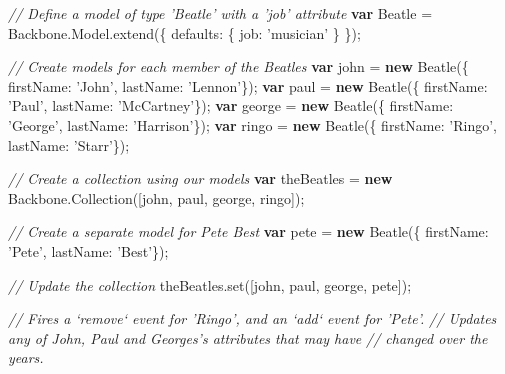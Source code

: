 \documentclass[9pt]{book}
\newenvironment{Shaded}{}{}
\newcommand{\KeywordTok}[1]{\textcolor[rgb]{0.00,0.44,0.13}{\textbf{{#1}}}}
\newcommand{\DataTypeTok}[1]{\textcolor[rgb]{0.56,0.13,0.00}{{#1}}}
\newcommand{\StringTok}[1]{\textcolor[rgb]{0.25,0.44,0.63}{{#1}}}
\newcommand{\CommentTok}[1]{\textcolor[rgb]{0.38,0.63,0.69}{\textit{{#1}}}}
\newcommand{\OtherTok}[1]{\textcolor[rgb]{0.00,0.44,0.13}{{#1}}}
\newcommand{\FunctionTok}[1]{\textcolor[rgb]{0.02,0.16,0.49}{{#1}}}
\newcommand{\NormalTok}[1]{{#1}}
\begin{document}
\begin{Shaded}
\begin{Highlighting}[]

\CommentTok{// Define a model of type 'Beatle' with a 'job' attribute}
\KeywordTok{var} \NormalTok{Beatle = }\OtherTok{Backbone}\NormalTok{.}\OtherTok{Model}\NormalTok{.}\FunctionTok{extend}\NormalTok{(\{}
  \DataTypeTok{defaults}\NormalTok{: \{}
    \DataTypeTok{job}\NormalTok{: }\StringTok{'musician'}
  \NormalTok{\}}
\NormalTok{\});}

\CommentTok{// Create models for each member of the Beatles}
\KeywordTok{var} \NormalTok{john = }\KeywordTok{new} \FunctionTok{Beatle}\NormalTok{(\{ }\DataTypeTok{firstName}\NormalTok{: }\StringTok{'John'}\NormalTok{, }\DataTypeTok{lastName}\NormalTok{: }\StringTok{'Lennon'}\NormalTok{\});}
\KeywordTok{var} \NormalTok{paul = }\KeywordTok{new} \FunctionTok{Beatle}\NormalTok{(\{ }\DataTypeTok{firstName}\NormalTok{: }\StringTok{'Paul'}\NormalTok{, }\DataTypeTok{lastName}\NormalTok{: }\StringTok{'McCartney'}\NormalTok{\});}
\KeywordTok{var} \NormalTok{george = }\KeywordTok{new} \FunctionTok{Beatle}\NormalTok{(\{ }\DataTypeTok{firstName}\NormalTok{: }\StringTok{'George'}\NormalTok{, }\DataTypeTok{lastName}\NormalTok{: }\StringTok{'Harrison'}\NormalTok{\});}
\KeywordTok{var} \NormalTok{ringo = }\KeywordTok{new} \FunctionTok{Beatle}\NormalTok{(\{ }\DataTypeTok{firstName}\NormalTok{: }\StringTok{'Ringo'}\NormalTok{, }\DataTypeTok{lastName}\NormalTok{: }\StringTok{'Starr'}\NormalTok{\});}

\CommentTok{// Create a collection using our models}
\KeywordTok{var} \NormalTok{theBeatles = }\KeywordTok{new} \OtherTok{Backbone}\NormalTok{.}\FunctionTok{Collection}\NormalTok{([john, paul, george, ringo]);}

\CommentTok{// Create a separate model for Pete Best}
\KeywordTok{var} \NormalTok{pete = }\KeywordTok{new} \FunctionTok{Beatle}\NormalTok{(\{ }\DataTypeTok{firstName}\NormalTok{: }\StringTok{'Pete'}\NormalTok{, }\DataTypeTok{lastName}\NormalTok{: }\StringTok{'Best'}\NormalTok{\});}

\CommentTok{// Update the collection}
\OtherTok{theBeatles}\NormalTok{.}\FunctionTok{set}\NormalTok{([john, paul, george, pete]);}

\CommentTok{// Fires a `remove` event for 'Ringo', and an `add` event for 'Pete'.}
\CommentTok{// Updates any of John, Paul and Georges's attributes that may have}
\CommentTok{// changed over the years.}
\end{Highlighting}
\end{Shaded}
\end{document}
